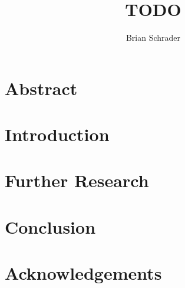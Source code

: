 \documentclass{article}
\title{TODO}
\author{Brian Schrader}
\begin{document}
\maketitle

\section{Abstract}


\section{Introduction}


\section{Further Research}


\section{Conclusion}


\section{Acknowledgements}



\end{document}
